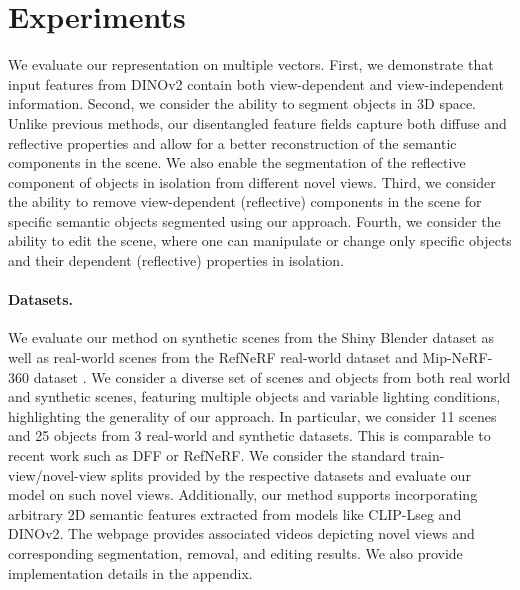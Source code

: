 




\section{Experiments} \label{sec:results}

We evaluate our representation on multiple vectors. 
First, we demonstrate that input features from DINOv2 contain both view-dependent and view-independent information. 
Second, we consider the ability to segment objects in 3D space. Unlike previous methods, our disentangled feature fields capture both diffuse and reflective properties and allow for a better reconstruction of the semantic components in the scene. We also enable the segmentation of the reflective component of objects in isolation from different novel views.
Third, we consider the ability to remove view-dependent (reflective) components in the scene for specific semantic objects segmented using our approach. Fourth, we consider the ability to edit the scene, where one can manipulate or change only specific objects and their dependent (reflective) properties in isolation.  

\paragraph{Datasets.} We evaluate our method on synthetic scenes from the Shiny Blender \cite{verbin2022refnerf} dataset as well as real-world scenes from the RefNeRF real-world \cite{verbin2022refnerf} dataset and Mip-NeRF-360 dataset \cite{barron2022mipnerf360}. We consider a diverse set of scenes and objects from both real world and synthetic scenes, featuring multiple objects and variable lighting conditions, highlighting the generality of our approach. 
In particular, we consider 11 scenes and 25 objects from 3 real-world and synthetic datasets. This is comparable to recent work such as DFF or RefNeRF.  We consider the standard train-view/novel-view splits provided by the respective datasets and evaluate our model on such novel views. 
Additionally, our method supports incorporating arbitrary 2D semantic features extracted from models like CLIP-Lseg and DINOv2. 
The webpage provides associated videos depicting novel views and corresponding segmentation, removal, and editing results. We also provide implementation details in the appendix. 












